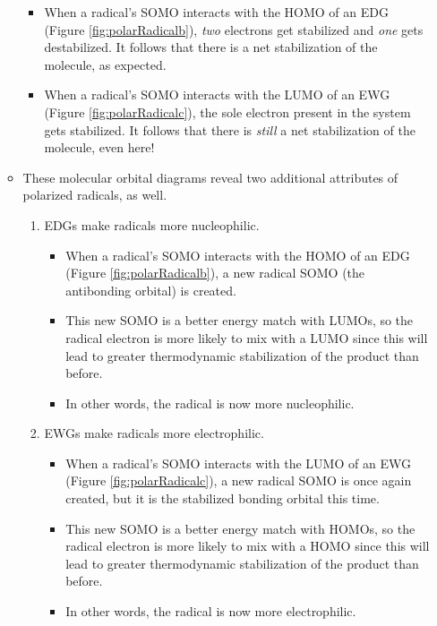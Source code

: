 \documentclass[../notes.tex]{subfiles}
\begin{document}
\begin{itemize}
\begin{itemize}
\begin{itemize}
            \item When a radical's SOMO interacts with the HOMO of an EDG (Figure \ref{fig:polarRadicalb}), \emph{two} electrons get stabilized and \emph{one} gets destabilized. It follows that there is a net stabilization of the molecule, as expected.
            \item When a radical's SOMO interacts with the LUMO of an EWG (Figure \ref{fig:polarRadicalc}), the sole electron present in the system gets stabilized. It follows that there is \emph{still} a net stabilization of the molecule, even here!
        \end{itemize}
        \item These molecular orbital diagrams reveal two additional attributes of polarized radicals, as well.
        \begin{enumerate}
            \item EDGs make radicals more nucleophilic.
            \begin{itemize}
                \item When a radical's SOMO interacts with the HOMO of an EDG (Figure \ref{fig:polarRadicalb}), a new radical SOMO (the antibonding orbital) is created.
                \item This new SOMO is a better energy match with LUMOs, so the radical electron is more likely to mix with a LUMO since this will lead to greater thermodynamic stabilization of the product than before.
                \item In other words, the radical is now more nucleophilic.
            \end{itemize}
            \item EWGs make radicals more electrophilic.
            \begin{itemize}
                \item When a radical's SOMO interacts with the LUMO of an EWG (Figure \ref{fig:polarRadicalc}), a new radical SOMO is once again created, but it is the stabilized bonding orbital this time.
                \item This new SOMO is a better energy match with HOMOs, so the radical electron is more likely to mix with a HOMO since this will lead to greater thermodynamic stabilization of the product than before.
                \item In other words, the radical is now more electrophilic.
            \end{itemize}
        \end{enumerate}
    \end{itemize}

\end{itemize}
\end{document}

